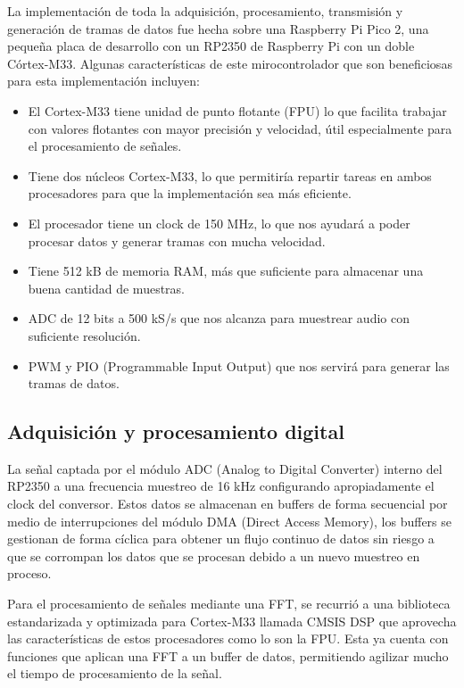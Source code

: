 \documentclass[conference]{IEEEtran}
\begin{document}
La implementación de toda la adquisición, procesamiento, transmisión y generación de tramas de datos fue hecha sobre una Raspberry Pi Pico 2, una pequeña placa de desarrollo con un RP2350 \cite{raspberrypi2024_rp2350_datasheet} de Raspberry Pi con un doble Córtex-M33. Algunas características de este mirocontrolador que son beneficiosas para esta implementación incluyen:

\begin{itemize}
    \item El Cortex-M33 tiene unidad de punto flotante (FPU) lo que facilita trabajar con valores flotantes con mayor precisión y velocidad, útil especialmente para el procesamiento de señales.
    \item Tiene dos núcleos Cortex-M33, lo que permitiría repartir tareas en ambos procesadores para que la implementación sea más eficiente.
    \item El procesador tiene un clock de 150 MHz, lo que nos ayudará a poder procesar datos y generar tramas con mucha velocidad.
    \item Tiene 512 kB de memoria RAM, más que suficiente para almacenar una buena cantidad de muestras.
    \item ADC de 12 bits a 500 kS/s que nos alcanza para muestrear audio con suficiente resolución.
    \item PWM y PIO (Programmable Input Output) que nos servirá para generar las tramas de datos.
\end{itemize}

\subsection{Adquisición y procesamiento digital}

La señal captada por el módulo ADC (Analog to Digital Converter) interno del RP2350 a una frecuencia muestreo de 16 kHz configurando apropiadamente el clock del conversor. Estos datos se almacenan en buffers de forma secuencial por medio de interrupciones del módulo DMA (Direct Access Memory), los buffers se gestionan de forma cíclica para obtener un flujo continuo de datos sin riesgo a que se corrompan los datos que se procesan debido a un nuevo muestreo en proceso.

Para el procesamiento de señales mediante una FFT, se recurrió a una biblioteca estandarizada y optimizada para Cortex-M33 llamada CMSIS DSP que aprovecha las características de estos procesadores como lo son la FPU. Esta ya cuenta con funciones que aplican una FFT a un buffer de datos, permitiendo agilizar mucho el tiempo de procesamiento de la señal.
\end{document}
